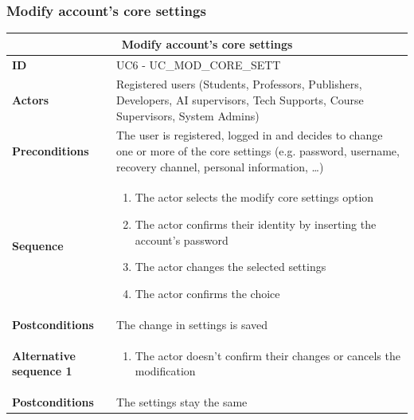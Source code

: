 \subsubsection{Modify account’s core settings}
\begin{tabular}{|m{2.5cm}|m{8cm}|}
	\hline
	\multicolumn{2}{|c|}{Modify account’s core settings} \\
	\hline
	\textbf{ID} & UC6 - UC\_MOD\_CORE\_SETT \\
	\hline
	\textbf{Actors} & Registered users (Students, Professors, Publishers, Developers, AI supervisors, Tech Supports, Course Supervisors, System Admins) \\
	\hline
	\textbf{Preconditions} & The user is registered, logged in and decides to change one or more of the core settings (e.g. password, username, recovery channel, personal information, …) \\
	\hline
	\textbf{Sequence} & 
	\begin{enumerate}
		\item The actor selects the modify core settings option
		\item The actor confirms their identity by inserting the account’s password
		\item The actor changes the selected settings
		\item The actor confirms the choice
	\end{enumerate} \\
	\hline
	\textbf{Postconditions} & The change in settings is saved \\
	\hline
	
	\textbf{Alternative sequence 1} & 
	\begin{enumerate}
		\item The actor doesn’t confirm their changes or cancels the modification
	\end{enumerate} \\
	\hline
	\textbf{Postconditions} & The settings stay the same \\
	\hline
\end{tabular}

